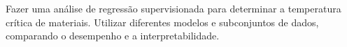 Fazer uma análise de regressão supervisionada para determinar a temperatura crítica de materiais. Utilizar diferentes modelos e subconjuntos de dados, comparando o desempenho e a interpretabilidade.